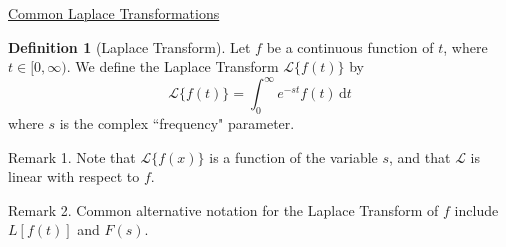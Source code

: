 \documentclass[letterpaper,11pt]{article} %
\theoremstyle{definition}
\newtheorem*{definition*}{Definition}
\begin{document}
    \begin{center}
        \LARGE{\underline{Common Laplace Transformations}} \\
    \end{center}

    \begin{definition*}[Laplace Transform]
        Let $f$ be a continuous function of $t$, where $t \in [0, \infty)$. We define the Laplace Transform $\mathcal L\{f(t)\}$ by
        \begin{equation*}
            \mathcal L\{f(t)\} = \int_0^\infty e^{-st} f(t) \, \mathrm dt
        \end{equation*}
        where $s$ is the complex ``frequency" parameter.
        
        Remark 1. Note that $\mathcal L\{f(x)\}$ is a function of the variable $s$, and that $\mathcal L$ is linear with respect to $f$.
        
        Remark 2. Common alternative notation for the Laplace Transform of $f$ include $L[f(t)]$ and $F(s)$.
    \end{definition*}
    
\end{document}
